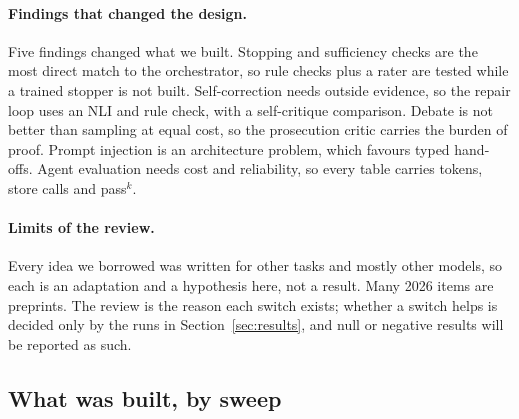 \paragraph{Findings that changed the design.} Five findings changed what we built. Stopping and sufficiency checks are the most direct match to the orchestrator, so rule checks plus a rater are tested while a trained stopper is not built. Self-correction needs outside evidence, so the repair loop uses an NLI and rule check, with a self-critique comparison. Debate is not better than sampling at equal cost, so the prosecution critic carries the burden of proof. Prompt injection is an architecture problem, which favours typed hand-offs. Agent evaluation needs cost and reliability, so every table carries tokens, store calls and pass$^k$.

\paragraph{Limits of the review.} Every idea we borrowed was written for other tasks and mostly other models, so each is an adaptation and a hypothesis here, not a result. Many 2026 items are preprints. The review is the reason each switch exists; whether a switch helps is decided only by the runs in Section~\ref{sec:results}, and null or negative results will be reported as such.

\subsection{What was built, by sweep}

